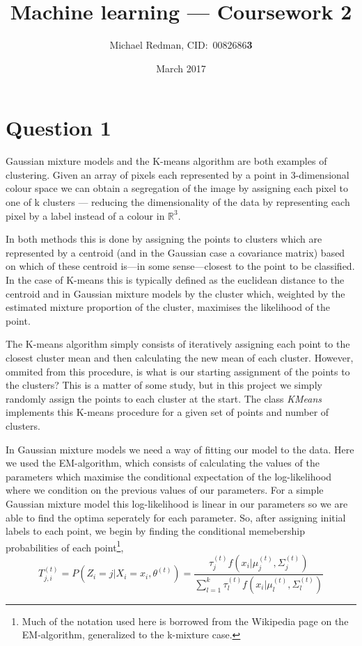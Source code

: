 \documentclass[a4paper]{article}
\begin{document}
\title{Machine learning --- Coursework 2}
\author{Michael Redman, CID:\ 0082686\textbf{3}}
\date{March 2017}

\maketitle

\section*{Question 1}

Gaussian mixture models and the K-means algorithm are both examples of clustering. Given an array of pixels each represented by a point in 3-dimensional colour space we can obtain a segregation of the image by assigning each pixel to one of k clusters --- reducing the dimensionality of the data by representing each pixel by a label instead of a colour in $\mathbb{R}^3$. 

In both methods this is done by assigning the points to clusters which are represented by a centroid (and in the Gaussian case a covariance matrix) based on which of these centroid is---in some sense---closest to the point to be classified. In the case of K-means this is typically defined as the euclidean distance to the centroid and in Gaussian mixture models by the cluster which, weighted by the estimated mixture proportion of the cluster, maximises the likelihood of the point.

The K-means algorithm simply consists of iteratively assigning each point to the closest cluster mean and then calculating the new mean of each cluster. However, ommited from this procedure, is what is our starting assignment of the points to the clusters? This is a matter of some study, but in this project we simply randomly assign the points to each cluster at the start. The class \emph{KMeans} implements this K-means procedure for a given set of points and number of clusters.    

In Gaussian mixture models we need a way of fitting our model to the data. Here we used the EM-algorithm, which consists of calculating the values of the parameters which maximise the conditional expectation of the log-likelihood where we condition on the previous values of our parameters. For a simple Gaussian mixture model this log-likelihood is linear in our parameters so we are able to find the optima seperately for each parameter. So, after assigning initial labels to each point, we begin by finding the conditional memebership probabilities of each point\footnote{Much of the notation used here is borrowed from the Wikipedia page on the EM-algorithm, generalized to the k-mixture case.},
\begin{equation}
T_{j,i}^{(t)} = P(Z_i = j | X_i = x_i, \theta^{(t)}) = \frac{\tau_j^(t) f(x_i | \mu_j^{(t)}, \Sigma_j^{(t)})}{\sum_{l=1}^k \tau_l^(t) f(x_i | \mu_l^{(t)}, \Sigma_l^{(t)})}
\end{equation}
\end{document}
